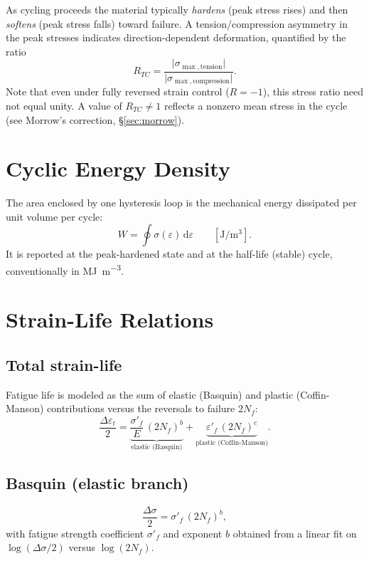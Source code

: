 \documentclass[11pt]{article}
\begin{document}
As cycling proceeds the material typically \emph{hardens} (peak stress rises) and then
\emph{softens} (peak stress falls) toward failure. A tension/compression asymmetry in the
peak stresses indicates direction-dependent deformation, quantified by the ratio
\begin{equation}
  R_{TC} = \frac{\lvert \sigma_{\max,\text{tension}} \rvert}
                {\lvert \sigma_{\max,\text{compression}} \rvert}.
\end{equation}
Note that even under fully reversed strain control ($R=-1$), this stress ratio need not equal
unity. A value of $R_{TC}\neq 1$ reflects a nonzero mean stress in the cycle (see Morrow's correction,
\S\ref{sec:morrow}).

\section{Cyclic Energy Density}

The area enclosed by one hysteresis loop is the mechanical energy dissipated per unit volume
per cycle:
\begin{equation}
  W = \oint \sigma(\varepsilon)\,\mathrm{d}\varepsilon
  \qquad \left[\si{\joule\per\cubic\meter}\right].
\end{equation}
It is reported at the peak-hardened state and at the half-life (stable) cycle, conventionally
in \si{\mega\joule\per\cubic\meter}.

\section{Strain-Life Relations}

\subsection{Total strain-life}
Fatigue life is modeled as the sum of elastic (Basquin) and plastic (Coffin-Manson)
contributions versus the reversals to failure $2N_f$:
\begin{equation}
  \frac{\Delta\varepsilon_t}{2}
  = \underbrace{\frac{\sigma'_f}{E}\,(2N_f)^{b}}_{\text{elastic (Basquin)}}
  + \underbrace{\varepsilon'_f\,(2N_f)^{c}}_{\text{plastic (Coffin-Manson)}}.
\end{equation}

\subsection{Basquin (elastic branch)}
\begin{equation}
  \frac{\Delta\sigma}{2} = \sigma'_f\,(2N_f)^{b},
\end{equation}
with fatigue strength coefficient $\sigma'_f$ and exponent $b$ obtained from a linear fit on
$\log(\Delta\sigma/2)$ versus $\log(2N_f)$.
\end{document}

